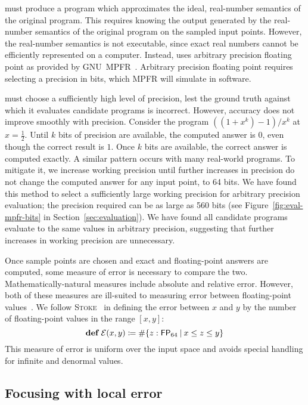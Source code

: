 \documentclass[paper.tex]{subfiles}
\begin{document}
\casio must produce a program which approximates
  the ideal, real-number semantics of the original program.
This requires knowing the output generated by
  the real-number semantics of the original program
  on the sampled input points.
However, the real-number semantics is not executable,
  since exact real numbers cannot be efficiently represented on a computer.
Instead, \casio uses arbitrary precision floating point
  as provided by GNU~MPFR~\cite{acm07-mpfr}.
Arbitrary precision floating point requires selecting a precision in bits,
  which MPFR will simulate in software.

\casio must choose a sufficiently high level of precision,
  lest the ground truth against which it evaluates candidate programs is incorrect.
However, accuracy does not improve smoothly with precision.
Consider the program $((1 + x^k) - 1) / x^k$ at $x = \frac12$.
Until $k$ bits of precision are available,
  the computed answer is $0$, even though the correct result is $1$.
Once $k$ bits are available, the correct answer is computed exactly.
A similar pattern occurs with many real-world programs.
To mitigate it, we increase working precision
  until further increases in precision do not change
  the computed answer for any input point, to 64 bits.
We have found this method to select a sufficiently large
  working precision for arbitrary precision evaluation;
  the precision required can be as large as 560 bits
  (see Figure~\ref{fig:eval-mpfr-bits} in Section~\ref{sec:evaluation}).
We have found all candidate programs evaluate
  to the same values in arbitrary precision,
  suggesting that further increases in working precision are unnecessary.

Once sample points are chosen and exact and floating-point answers
  are computed, some measure of error is necessary to compare the two.
Mathematically-natural measures include absolute and relative error.
However, both of these measures are ill-suited to measuring error
  between floating-point values~\cite{pldi14-stoke}.
We follow \textsc{Stoke}~\cite{pldi14-stoke}
  in defining the error between $x$ and $y$ by
  the number of floating-point values in the range $[x, y]$:
\[
\!def!\:\Err(x, y) \ceq \#\{ z : \FP_{64}\:|\:x \le z \le y \}
\]
This measure of error is uniform over the input space
  and avoids special handling for infinite and denormal values.

\subsection{Focusing with local error}
\end{document}
